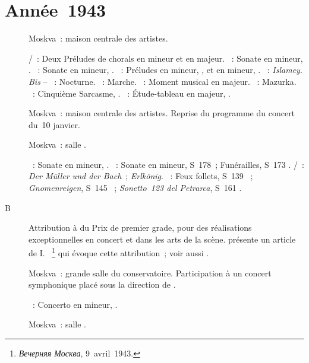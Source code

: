 \section{Année~1943}

\begin{description}
 \item[]
 Moskva~: maison centrale des artistes.

 \textsc{\JBach{}/\Busoni{}}~: Deux Préludes de chorals en \kG mineur et en
 \kG majeur.
 \textsc{\Beethoven{}}~: Sonate en \kF mineur, .
 \textsc{\Chopin{}}~: Sonate en \kB \Flat mineur, .
 \textsc{\Rachmaninov{}}~: Préludes en \kC \Sharp mineur, 
 , et en \kG \Sharp mineur,  .
 \textsc{\Balakirev{}}~: \emph{Islamey}.
 \emph{Bis} -- \textsc{\Glinka{}}~: Nocturne.
 \textsc{\Prokofiev{}}~: Marche.
 \textsc{\Schubert{}}~: Moment musical en \kA \Flat majeur.
 \textsc{\Chopin{}}~: Mazurka.
 \textsc{\Prokofiev{}}~: Cinquième Sarcasme,  .
 \textsc{\Rachmaninov{}}~: Étude-tableau en \kE \Flat majeur, 
 .
 \item[]
 Moskva~: maison centrale des artistes.
 Reprise du programme du concert du~10 janvier.
 \item[]
 Moskva~: salle \Tchaikovski{}.

 \textsc{\Beethoven{}}~: Sonate en \kC \Sharp mineur,  .
 \textsc{\Liszt{}}~: Sonate en \kB mineur, S~178~; Funérailles, S~173
 .
 \textsc{\Schubert{}/\Liszt{}}~: \emph{Der Müller und der Bach}~;
 \emph{Erlkönig}.
 \textsc{\Liszt{}}~: Feux follets, S~139 ~; \emph{Gnomenreigen},
 S~145 ~; \emph{Sonetto~123 del Petrarca}, S~161 .
 \item[B]
 Attribution à \VSofronitsky{} du Prix \Staline{} de premier grade, pour
 des réalisations exceptionnelles en concert et dans les arts de la scène.
 \citet{Lazarev20} présente un article de I.~\Martinov{}%
 \footnote{\foreignlanguage{russian}{\emph{Вечерняя Москва}}, 9~avril~1943.}
 qui évoque cette attribution~; voir aussi \citet{Zagursky43}.
 \item[]
 Moskva~: grande salle du conservatoire.
 Participation à un concert symphonique placé sous la direction de
 \NRakhline{}.

 \textsc{\Scriabine{}}~: Concerto en \kF \Sharp mineur, .
 \item[]
 Moskva~: salle \Tchaikovski{}.


\end{description}
